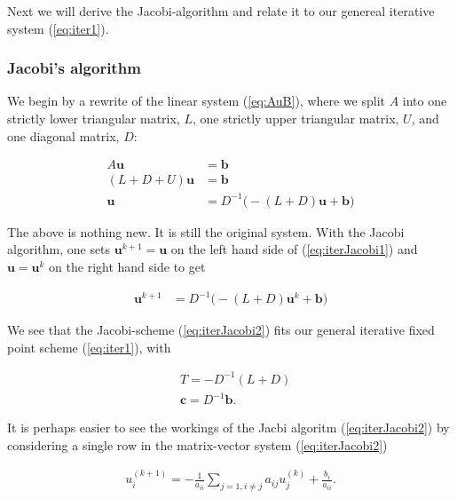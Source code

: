 \documentclass{article}
\begin{document}
Next we will derive the Jacobi-algorithm and relate it to our genereal iterative system (\ref{eq:iter1}).

\subsubsection{Jacobi's algorithm}
We begin by a rewrite of the linear system (\ref{eq:AuB}), where we split $A$ into one strictly lower triangular matrix, $L$, one strictly upper triangular matrix, $U$, and one diagonal matrix, $D$:

\begin{subequations}
	\begin{align}
		A \mathbf{u} &= \mathbf{b}\\
		(L + D + U) \mathbf{u} &= \mathbf{b}\\
		\mathbf{u} &= D^{-1} \Big(-(L+D) \mathbf{u} + \mathbf{b}\Big)\label{eq:iterJacobi1}
	\end{align}
\end{subequations}

The above is nothing new. It is still the original system. With the Jacobi algorithm, one sets $\mathbf{u}^{k+1} = \mathbf{u}$ on the left hand side of (\ref{eq:iterJacobi1}) and $\mathbf{u} = \mathbf{u}^k$ on the right hand side to get

\begin{subequations}
	\begin{align}
	\mathbf{u}^{k+1}  &= D^{-1} \Big(-(L+D) \mathbf{u}^k + \mathbf{b}\Big)\label{eq:iterJacobi2}
	\end{align}
\end{subequations}

We see that the Jacobi-scheme (\ref{eq:iterJacobi2}) fits our general iterative fixed point scheme (\ref{eq:iter1}), with

\begin{subequations}\label{eq:jacobiFixed}
	\begin{align}
		&T = -D^{-1}(L+D)\\
		&\mathbf{c} = D^{-1} \mathbf{b}.
	\end{align}
\end{subequations}

It is perhaps easier to see the workings of the Jacbi algoritm (\ref{eq:iterJacobi2}) by considering a single row in the matrix-vector system (\ref{eq:iterJacobi2}) 

\begin{subequations}\label{eq:jacobiRow}
	\begin{align}
		u_i^{(k+1)} = - \frac{1}{a_{ii}} \sum_{j=1,i \neq j} a_{ij} u_j^{(k)} + \frac{b_i}{a_{ii}}.
	\end{align}
\end{subequations}
\end{document}
